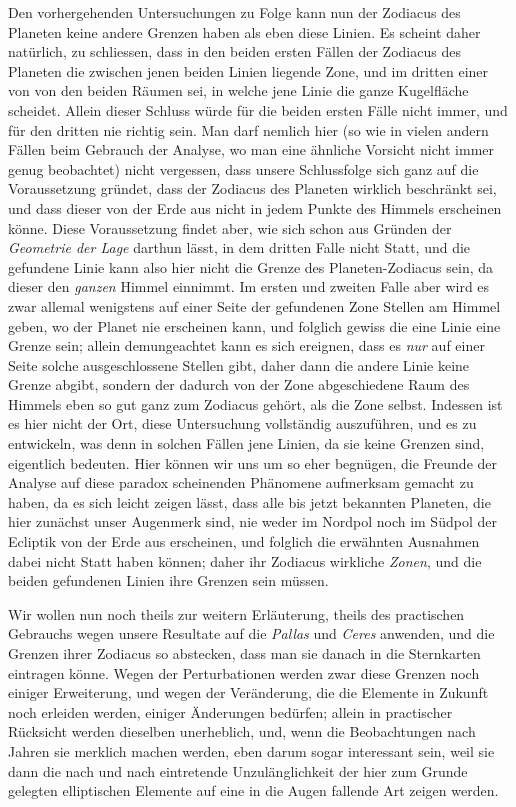 Den vorhergehenden Untersuchungen zu Folge kann nun der Zodiacus des
Planeten keine andere Grenzen haben als eben diese Linien. Es scheint daher
natürlich, zu schliessen, dass in den beiden ersten Fällen der Zodiacus des Planeten
die zwischen jenen beiden Linien liegende Zone, und im dritten einer von
von den beiden Räumen sei, in welche jene Linie die ganze Kugelfläche scheidet.
Allein dieser Schluss würde für die beiden ersten Fälle nicht immer, und
für den dritten nie richtig sein. Man darf nemlich hier (so wie in vielen andern
Fällen beim Gebrauch der Analyse, wo man eine ähnliche Vorsicht nicht immer
genug beobachtet) nicht vergessen, dass unsere Schlussfolge sich ganz auf die
Voraussetzung gründet, dass der Zodiacus des Planeten wirklich beschränkt sei,
und dass dieser von der Erde aus nicht in jedem Punkte des Himmels erscheinen
könne. Diese Voraussetzung findet aber, wie sich schon aus Gründen der \textit{Geometrie
der Lage} darthun lässt, in dem dritten Falle nicht Statt, und die gefundene
Linie kann also hier nicht die Grenze des Planeten-Zodiacus sein, da dieser
den \textit{ganzen} Himmel einnimmt. Im ersten und zweiten Falle aber wird es
zwar allemal wenigstens auf einer Seite der gefundenen Zone Stellen am Himmel
geben, wo der Planet nie erscheinen kann, und folglich gewiss die eine Linie
eine Grenze sein; allein demungeachtet kann es sich ereignen, dass es \textit{nur} auf
einer Seite solche ausgeschlossene Stellen gibt, daher dann die andere Linie keine
Grenze abgibt, sondern der dadurch von der Zone abgeschiedene Raum des Himmels
eben so gut ganz zum Zodiacus gehört, als die Zone selbst. Indessen
ist es hier nicht der Ort, diese Untersuchung vollständig auszuführen, und es
zu entwickeln, was denn in solchen Fällen jene Linien, da sie keine Grenzen
sind, eigentlich bedeuten. Hier können wir uns um so eher begnügen, die
Freunde der Analyse auf diese paradox scheinenden Phänomene aufmerksam gemacht
zu haben, da es sich leicht zeigen lässt, dass alle bis jetzt bekannten Planeten,
die hier zunächst unser Augenmerk sind, nie weder im Nordpol noch im
Südpol der Ecliptik von der Erde aus erscheinen, und folglich die erwähnten
Ausnahmen dabei nicht Statt haben können; daher ihr Zodiacus wirkliche \textit{Zonen},
und die beiden gefundenen Linien ihre Grenzen sein müssen.

Wir wollen nun noch theils zur weitern Erläuterung, theils des practischen
Gebrauchs wegen unsere Resultate auf die \textit{Pallas} und \textit{Ceres} anwenden, und die
%
Grenzen ihrer Zodiacus so abstecken, dass man sie danach in die Sternkarten eintragen
könne. Wegen der Perturbationen werden zwar diese Grenzen noch einiger
Erweiterung, und wegen der Veränderung, die die Elemente in Zukunft
noch erleiden werden, einiger Änderungen bedürfen; allein in practischer Rücksicht
werden dieselben unerheblich, und, wenn die Beobachtungen nach Jahren
sie merklich machen werden, eben darum sogar interessant sein, weil sie dann
die nach und nach eintretende Unzulänglichkeit der hier zum Grunde gelegten
elliptischen Elemente auf eine in die Augen fallende Art zeigen werden.

